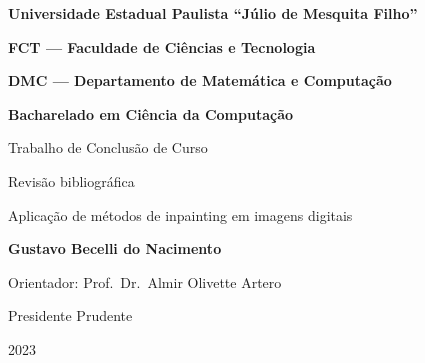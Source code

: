 \thispagestyle{empty}
\begin{center}
\bf{Universidade Estadual Paulista ``Júlio de Mesquita Filho''}
  
  \bf{FCT — Faculdade de Ciências e Tecnologia}
  
  \bf{DMC — Departamento de Matemática e Computação}
  
  \bf{Bacharelado em Ciência da Computação}
  
  \vspace*{\fill}
  \vspace{42pt}
  \Large{	\textmd{Trabalho de Conclusão de Curso}}
    
  \large{Revisão bibliográfica}
  
  \vspace{42pt}
  \Large{Aplicação de métodos de inpainting em imagens digitais}
  
  \vspace{42pt}
  \normalsize{\bf{Gustavo Becelli do Nacimento}
  
  \vspace{12pt}
  Orientador: \textmd{Prof.\ Dr.\ Almir Olivette Artero}}
  
  \vspace*{\fill}
  \vspace{12pt}
  Presidente Prudente
  
  2023
\end{center}